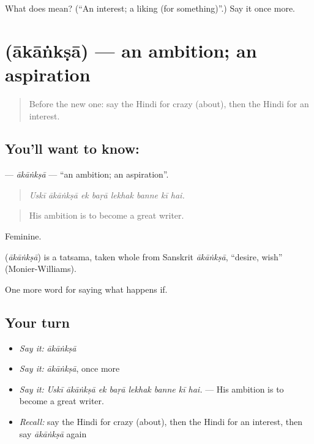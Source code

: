 \begin{tcolorbox}[breakable,colback=teal!4,colframe=teal!35!black,title={Before you move on}]
What does  mean? (\textquotedblleft{}An interest; a liking (for something)\textquotedblright{}.) Say it once more.
\end{tcolorbox}
\section[\texorpdfstring{\hi{आकांक्षा} (ākāṅkṣā)}{आकांक्षा (ākāṅkṣā)}]{ (ākāṅkṣā) — an ambition; an aspiration}

\label{lesson:HI-C558-akanksa}



\begin{quote}
Before the new one: say the Hindi for crazy (about), then the Hindi for an interest.
\end{quote}

\subsection*{You'll want to know: }
\textbf{} — \emph{ākāṅkṣā} — \textquotedblleft{}an ambition; an aspiration\textquotedblright{}.

\begin{quote}
       
\end{quote}

\begin{quote}
\emph{Uskī ākāṅkṣā ek baṛā lekhak banne kī hai.}
\end{quote}

\begin{quote}
His ambition is to become a great writer.
\end{quote}

Feminine.

\begin{cousinweb}
\textbf{} (\emph{ākāṅkṣā}) is a tatsama, taken whole from Sanskrit \emph{ākāṅkṣā}, \textquotedblleft{}desire, wish\textquotedblright{} (Monier-Williams).
\end{cousinweb}

\begin{grammarlens}[title={What you've built}]
One more word for saying what happens if.
\end{grammarlens}

\subsection*{Your turn}
\begin{itemize}
\raggedright
  \item \emph{Say it:} \emph{ākāṅkṣā}
  \item \emph{Say it:} \emph{ākāṅkṣā}, once more
  \item \emph{Say it:} \emph{Uskī ākāṅkṣā ek baṛā lekhak banne kī hai.} — His ambition is to become a great writer.
  \item \emph{Recall:} say the Hindi for crazy (about), then the Hindi for an interest, then say \emph{ākāṅkṣā} again
\end{itemize}

